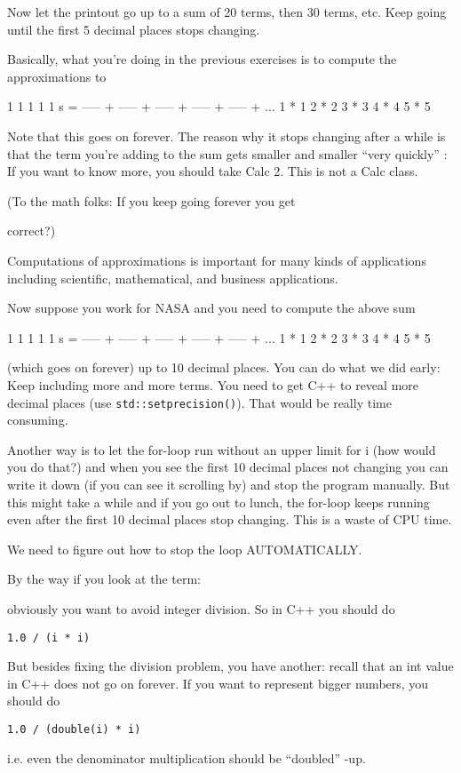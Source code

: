 Now let the printout go up to a sum of 20 terms, then 30 terms, etc.
Keep going until the first 5 decimal places stops changing.

Basically, what you're doing in the previous exercises
is to compute the approximations to
\begin{console}
      1       1       1       1       1
s = ----- + ----- + ----- + ----- + ----- + ...
    1 * 1   2 * 2   3 * 3   4 * 4   5 * 5
\end{console}
Note that this goes on forever. The reason why it stops changing after a
while is that the term you're adding to the sum gets
smaller and smaller ``very quickly'' :
If you want to know more, you should take Calc 2. This is not a Calc
class.

(To the math folks: If you keep going forever you get


correct?)

Computations of approximations is important for many kinds of
applications including scientific, mathematical, and business
applications.

Now suppose you work for NASA and you need to compute the above sum
\begin{console}
      1       1       1       1       1
s = ----- + ----- + ----- + ----- + ----- + ...
    1 * 1   2 * 2   3 * 3   4 * 4   5 * 5
\end{console}
(which goes on forever) up to 10 decimal places. You can do what we did
early: Keep including more and more terms. You need to get C++ to reveal
more decimal places (use \texttt{std::setprecision()}). That would be
really time consuming.

Another way is to let the for-loop run without an upper limit for i (how
would you do that?) and when you see the first 10 decimal places not
changing you can write it down (if you can see it scrolling by) and stop
the program manually. But this might take a while and if you go out to
lunch, the for-loop keeps running even after the first 10 decimal places
stop changing. This is a waste of CPU time.

We need to figure out how to stop the loop AUTOMATICALLY.

By the way if you look at the term:\\

obviously you want to avoid integer division. So in C++ you should do
\begin{center}
    \texttt{1.0 / (i * i)}
\end{center}
But besides fixing the division problem, you have another: recall that
an int value in C++ does not go on forever. If you want to represent
bigger numbers, you should do
\begin{center}
    \texttt{1.0 / (double(i) * i)}
\end{center}
i.e. even the denominator multiplication should be ``doubled'' -up.


